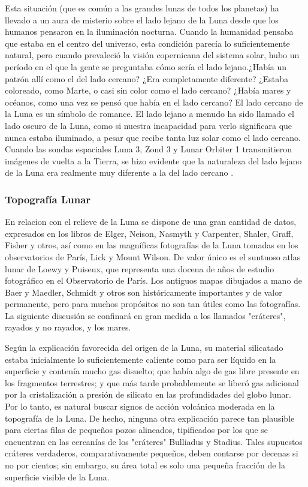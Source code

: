 \documentclass[12pt]{article}
\begin{document}
Esta situación (que es común a las grandes lunas de todos los planetas) ha llevado a un aura de 
misterio sobre el lado lejano de la Luna desde que los humanos pensaron en la iluminación nocturna. 
Cuando la humanidad pensaba que estaba en el centro del universo, esta condición parecía lo 
suficientemente natural, pero cuando prevaleció la visión copernicana del sistema solar, hubo un 
período en el que la gente se preguntaba cómo sería el lado lejano.¿Había un patrón allí como el del 
lado cercano? ¿Era completamente diferente? ¿Estaba coloreado, como Marte, o casi sin color como el 
lado cercano? ¿Había mares y océanos, como una vez se pensó que había en el lado cercano?
El lado cercano de la Luna es un símbolo de romance. El lado lejano a menudo ha sido llamado el 
lado oscuro de la Luna, como si nuestra incapacidad para verlo significara que nunca estaba iluminado, a pesar
que recibe tanta luz solar como el lado cercano. Cuando las sondas espaciales Luna 3, Zond 3 y Lunar Orbiter 
1 transmitieron imágenes de vuelta a la Tierra, se hizo evidente que la naturaleza del 
lado lejano de la Luna era realmente muy diferente a la del lado cercano \parencite{byrne2008far}.

\subsubsection{Topografía Lunar}
En relacion con el relieve de la Luna se dispone de una gran cantidad de datos, expresados en los 
libros de Elger, Neison, Nasmyth y Carpenter, 
Shaler, Graff, Fisher y otros, así como en 
las magníficas fotografías de la Luna tomadas 
en los observatorios de París, Lick y Mount Wilson. 
De valor único es el suntuoso atlas lunar 
de Loewy y Puiseux, que representa una 
docena de años de estudio fotográfico en el Observatorio de París. 
Los antiguos mapas dibujados a mano 
de Baer y Maedler, Schmidt y otros son 
históricamente importantes y de valor permanente, 
pero para muchos propósitos no son tan útiles como las 
fotografías. La siguiente discusión se 
confinará en gran medida a los llamados "cráteres", 
rayados y no rayados, y los mares. 

Según la explicación favorecida 
del origen de la Luna, su material silicatado 
estaba inicialmente lo suficientemente caliente como para ser líquido en 
la superficie y contenía mucho gas disuelto; que 
había algo de gas libre presente en los fragmentos terrestres; 
y que más tarde probablemente se liberó gas adicional por la cristalización a presión de 
silicato en las profundidades del globo lunar. 
Por lo tanto, es natural buscar signos de acción volcánica moderada 
en la topografía de la Luna. De 
hecho, ninguna otra explicación parece tan plausible para 
ciertas filas de pequeños pozos alineados, tipificados por 
los que se encuentran en las cercanías de los "cráteres" Bulliadus y Stadius. 
Tales supuestos cráteres verdaderos, comparativamente pequeños, deben contarse por 
decenas si no por cientos; sin embargo, su área total es 
solo una pequeña fracción de la superficie visible de la 
Luna. 
\end{document}
